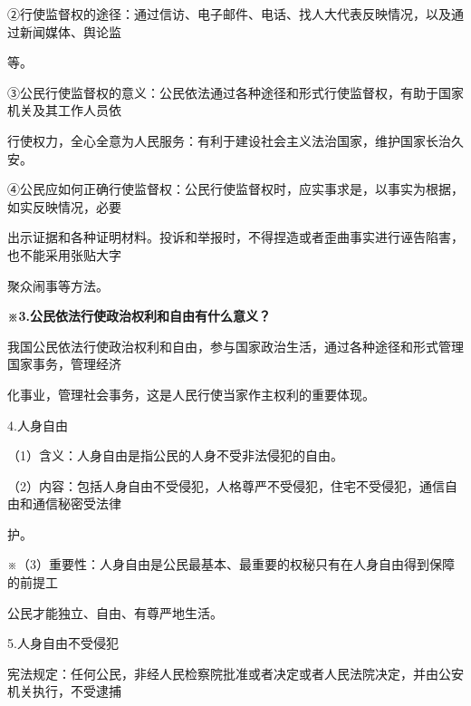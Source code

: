 \documentclass[lang=cn,11pt]{elegantbook}
\newcommand{\daofasym}[1]{{\daofasymbolfont #1}}
\newcommand{\daofasym}[1]{#1}
\begin{document}
\daofasym{②}行使监督权的途径：通过信访、电子邮件、电话、找人大代表反映情况，以及通过新闻媒体、舆论监\par

等。\par

\daofasym{③}公民行使监督权的意义：公民依法通过各种途径和形式行使监督权，有助于国家机关及其工作人员依\par

行使权力，全心全意为人民服务：有利于建设社会主义法治国家，维护国家长治久安。\par

\daofasym{④}公民应如何正确行使监督权：公民行使监督权时，应实事求是，以事实为根据，如实反映情况，必要\par

出示证据和各种证明材料。投诉和举报时，不得捏造或者歪曲事实进行诬告陷害，也不能采用张贴大字\par

聚众闹事等方法。\par

\textbf{※3.公民依法行使政治权利和自由有什么意义？}\par

我国公民依法行使政治权利和自由，参与国家政治生活，通过各种途径和形式管理国家事务，管理经济\par

化事业，管理社会事务，这是人民行使当家作主权利的重要体现。\par

4.人身自由\par

（1）含义：人身自由是指公民的人身不受非法侵犯的自由。\par

（2）内容：包括人身自由不受侵犯，人格尊严不受侵犯，住宅不受侵犯，通信自由和通信秘密受法律\par

护。\par

※（3）重要性：人身自由是公民最基本、最重要的权秘只有在人身自由得到保障的前提工\par

公民才能独立、自由、有尊严地生活。\par

5.人身自由不受侵犯\par

宪法规定：任何公民，非经人民检察院批准或者决定或者人民法院决定，并由公安机关执行，不受逮捕\par
\end{document}
